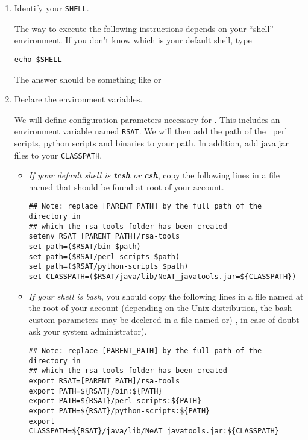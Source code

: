 \begin{enumerate}

\item Identify your \texttt{SHELL}.

  The way to execute the following instructions depends on your
  ``shell'' environment. If you don't know which is your default
  shell, type

\lstset{language=csh}

\begin{lstlisting}
echo $SHELL
\end{lstlisting}

The answer should be something like  or

\item Declare the \RSAT environment variables.

  We will define configuration parameters necessary for \RSAT.  This
  includes an environment variable named \texttt{RSAT}.  We will then
  add the path of the \RSAT \ perl scripts, python scripts and
  binaries to your path. In addition, add java jar files to your
  \texttt{CLASSPATH}.

\begin{itemize}

\item \emph{If your default shell is \textbf{tcsh} or \textbf{csh}},
  copy the following lines in a file named  that should
  be found at root of your account.

\begin{lstlisting}
## Note: replace [PARENT_PATH] by the full path of the directory in
## which the rsa-tools folder has been created
setenv RSAT [PARENT_PATH]/rsa-tools
set path=($RSAT/bin $path)
set path=($RSAT/perl-scripts $path)
set path=($RSAT/python-scripts $path)
set CLASSPATH=($RSAT/java/lib/NeAT_javatools.jar=${CLASSPATH})
\end{lstlisting}

\item \emph{If your shell is bash}, you should copy the following
  lines in a file named  at the root of your
  account (depending on the Unix distribution, the bash custom
  parameters may be declered in a file named  or)
  , in case of doubt ask your system administrator).

\begin{lstlisting}
## Note: replace [PARENT_PATH] by the full path of the directory in
## which the rsa-tools folder has been created
export RSAT=[PARENT_PATH]/rsa-tools
export PATH=${RSAT}/bin:${PATH}
export PATH=${RSAT}/perl-scripts:${PATH}
export PATH=${RSAT}/python-scripts:${PATH}
export CLASSPATH=${RSAT}/java/lib/NeAT_javatools.jar:${CLASSPATH}
\end{lstlisting}



\end{itemize}
\end{enumerate}
